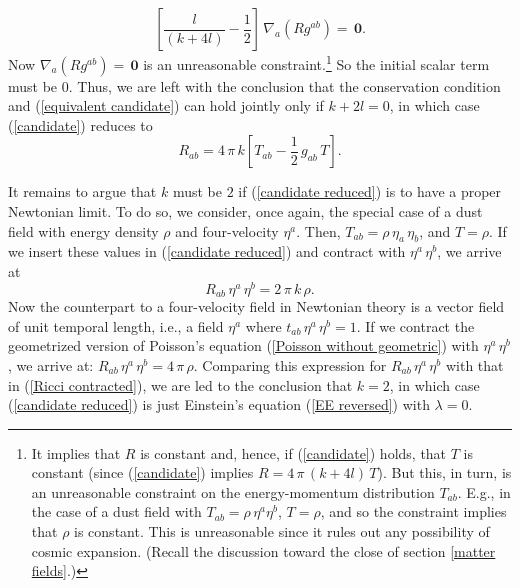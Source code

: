 \documentclass [12] {article}
\theoremstyle{plain}
\numberwithin{figure}{subsection}
\numberwithin{proposition}{subsection}
\begin{document}
%
\begin{equation*} 
\left[\frac{l}{(k + 4l)} - \frac{1}{2}\right]  \, \nabla_a (R g^{ab}) = \, \mathbf{0}.  
\end{equation*} 
%
Now $\nabla_a (R g^{ab}) = \, \mathbf{0}$ is an unreasonable constraint.\footnote{It implies that $R$ is constant and, hence, if (\ref{candidate}) holds, that $T$ is constant (since (\ref{candidate}) implies  $R = 4 \, \pi  \,  (k + 4 l) \, T$).  But this, in turn, is an unreasonable constraint on the energy-momentum distribution $T_{ab}$. E.g., in the case of a dust field with $T_{ab} = \rho \,  \eta^a \eta^b$,  $T = \rho$, and so the constraint implies that $\rho$ is constant. This is unreasonable since it rules out any possibility of cosmic expansion. (Recall the discussion toward the close of section \ref{matter fields}.)}  So the initial scalar term must be $0$. Thus, we are left with the conclusion that the conservation condition and (\ref{equivalent candidate}) can hold jointly only if $k + 2l = 0$, in which case (\ref{candidate}) reduces to 
\begin{equation} \label{candidate reduced}
R_{ab} = 4 \, \pi  \, k \left[T_{ab} -  \frac{1}{2} \,  g_{ab} \, T\right].
\end{equation}

It remains to argue that $k$ must be $2$ if (\ref{candidate reduced}) is to have a proper Newtonian limit. To do so, we consider, once again, the special case of a dust field with energy density $\rho$ and four-velocity $\eta^a$. Then, $T_{ab} = \rho \, \eta_a \, \eta_b$,  and  $T = \rho$. If we insert these values in (\ref {candidate reduced}) and contract with $\eta^a \, \eta^b$, we arrive at
\begin{equation} \label{Ricci contracted}
R_{ab} \, \eta^a \, \eta^b  =  2 \, \pi  \, k \, \rho.
\end{equation} 
Now the counterpart to a four-velocity field  in Newtonian theory is a vector field of unit temporal length, i.e., a field  $\eta^a$ where $t_{ab} \, \eta^a \, \eta^b = 1$.  If we contract  the geometrized version of Poisson's equation (\ref{Poisson without geometric}) with $\eta^a \, \eta^b$, we arrive at:   $R_{ab} \, \eta^a \, \eta^b  =  4 \, \pi  \, \rho$. Comparing this expression for  $R_{ab} \, \eta^a \, \eta^b$ with that in (\ref{Ricci contracted}), we are  led to the conclusion that $k = 2$, in which case (\ref{candidate reduced}) is just Einstein's equation (\ref{EE reversed}) with $\lambda = 0$.
\end{document}
